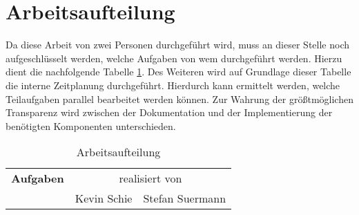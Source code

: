 \section{Arbeitsaufteilung}
\label{sec:Arbeitsaufteilung}
Da diese Arbeit von zwei Personen durchgeführt wird, muss an dieser Stelle noch aufgeschlüsselt werden, welche Aufgaben von wem durchgeführt werden. Hierzu dient die nachfolgende Tabelle \ref{tbl:arbeitsaufteilung}. Des Weiteren wird auf Grundlage dieser Tabelle die interne Zeitplanung durchgeführt. Hierdurch kann ermittelt werden, welche Teilaufgaben parallel bearbeitet werden können. Zur Wahrung der größtmöglichen Transparenz wird zwischen der Dokumentation und der Implementierung der benötigten Komponenten unterschieden. 

\begin{table}[]
\caption{Arbeitsaufteilung}
\label{tbl:arbeitsaufteilung}
\begin{tabular}{|l|c|c|}
\hline
{\bf Aufgaben}                                                    & \multicolumn{2}{c|}{realisiert von}                                    \\
                                                                  & \multicolumn{1}{l|}{Kevin Schie} & \multicolumn{1}{l|}{Stefan Suermann} \\


\end{tabular}
\end{table}
